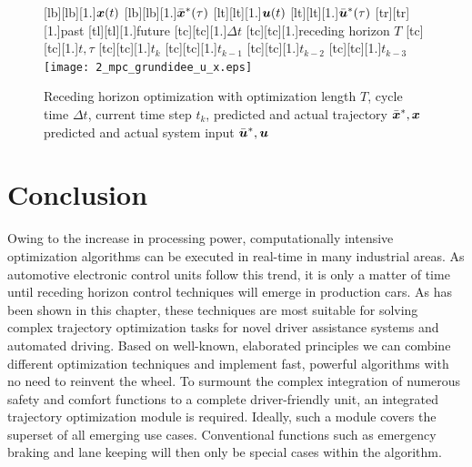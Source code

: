 \begin{figure}[h]
\centering
    [lb][lb][1.]{$\boldsymbol{x}(t)$}
		[lb][lb][1.]{$\bar{\boldsymbol{x}}^\ast(\tau)$}
		[lt][lt][1.]{$\boldsymbol{u}(t)$}
		[lt][lt][1.]{$\bar{\boldsymbol{u}}^\ast(\tau)$}
		[tr][tr][1.]{past}
		[tl][tl][1.]{future}
		[tc][tc][1.]{$\Delta t$}
		[tc][tc][1.]{receding horizon $T$}
		[tc][tc][1.]{$t,\tau$}
		[tc][tc][1.]{$t_k$}
		[tc][tc][1.]{$t_{k-1}$}
		[tc][tc][1.]{$t_{k-2}$}
		[tc][tc][1.]{$t_{k-3}$}
	\texttt{[image: 2\_mpc\_grundidee\_u\_x.eps]}
	\caption[Receding Horizon Optimization]{Receding horizon optimization with optimization length $T$, cycle time $\Delta t$, current time step $t_k$, predicted and actual trajectory  $\bar{\boldsymbol{x}}^\ast, \boldsymbol{x}$ predicted and actual system input $\bar{\boldsymbol{u}}^\ast, \boldsymbol{u}$}
	\label{fig:2_mpc_grundidee_u_x}
\end{figure}










\section{Conclusion}\label{S:57.6}
Owing to the increase in processing power, computationally intensive optimization algorithms can be executed in real-time in many industrial areas. As automotive electronic control units follow this trend, it is only a matter of time until receding horizon control techniques will emerge in production cars. As has been shown in this chapter, these techniques are most suitable for solving complex trajectory optimization tasks for novel driver assistance systems and automated driving. Based on well-known, elaborated principles we can combine different optimization techniques and implement fast, powerful algorithms with no need to reinvent the wheel.
To surmount the complex integration of numerous safety and comfort functions to a complete driver-friendly unit, an integrated trajectory optimization module is required. Ideally, such a module covers the superset of all emerging use cases. Conventional functions such as emergency braking and lane keeping will then only be special cases within the algorithm.


















